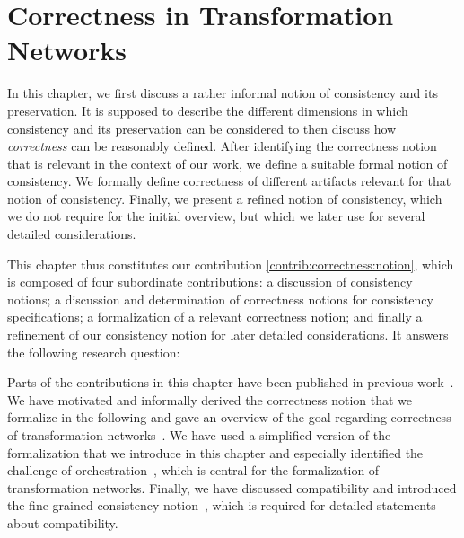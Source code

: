 \chapter{Correctness in Transformation Networks
}
\label{chap:correctness}

In this chapter, we first discuss a rather informal notion of consistency and its preservation. It is supposed to describe the different dimensions in which consistency and its preservation can be considered to then discuss how \emph{correctness} can be reasonably defined.
After identifying the correctness notion that is relevant in the context of our work, we define a suitable formal notion of consistency.
We formally define correctness of different artifacts relevant for that notion of consistency.
Finally, we present a refined notion of consistency, which we do not require for the initial overview, but which we later use for several detailed considerations.

This chapter thus constitutes our contribution \autoref{contrib:correctness:notion}, which is composed of four subordinate contributions: a discussion of consistency notions; a discussion and determination of correctness notions for consistency specifications; a formalization of a relevant correctness notion; and finally a refinement of our consistency notion for later detailed considerations.
It answers the following research question:


Parts of the contributions in this chapter have been published in previous work~.
We have motivated and informally derived the correctness notion that we formalize in the following and gave an overview of the goal regarding correctness of transformation networks~.
We have used a simplified version of the formalization that we introduce in this chapter and especially identified the challenge of orchestration~, which is central for the formalization of transformation networks.
Finally, we have discussed compatibility and introduced the fine-grained consistency notion~, which is required for detailed statements about compatibility.






